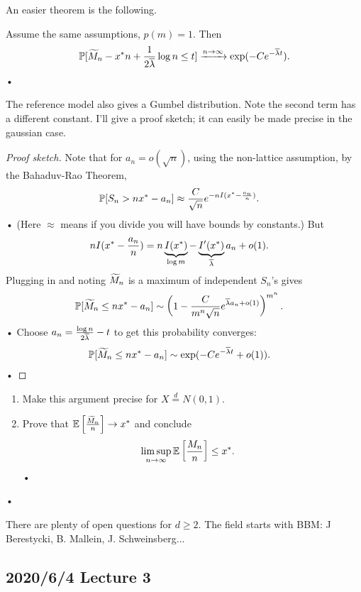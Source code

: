 An easier theorem is the following. %
\begin{thm}
Assume the same assumptions, $p(m)=1$. Then
\begin{align*}
\mathbb{P}[\widetilde{M}_n - x^* n + \frac{1}{2\overline{\lambda} }\log n\le t]
\xrightarrow{n\to \infty} \exp(-Ce^{-\overline{\lambda} t}). 
\end{align*}•
\end{thm}
The reference model also gives a Gumbel distribution. Note the second term has a different constant. I'll give a proof sketch; it can easily be made precise in the gaussian case. 
\begin{proof}[Proof sketch]
Note that for $a_n=o(\sqrt n)$, using the non-lattice assumption, by the Bahaduv-Rao Theorem,
\begin{align*}
\mathbb{P}[S_n > nx^* - a_n] &\approx \frac{C}{\sqrt n} e^{-nI(x^*-\frac{a_n}{n})}.
\end{align*}•
(Here $\approx$ means if you divide you will have bounds by constants.)
But 
\begin{align*}
nI(x^*-\frac{a_n}{n}) &= n\underbrace{I(x^*)}_{\log m} - \underbrace{I'(x^*)}_{\overline{\lambda}}a_n + o(1).
\end{align*}
Plugging in and noting $\widetilde{M}_n$ is a maximum of independent $S_n$'s gives
\begin{align*}
\mathbb{P}[\widetilde{M}_n \le nx^* - a_n]
&\sim \left( {1-\frac{C}{m^n\sqrt n} e^{\overline{\lambda} a_n + o(1)}} \right)^{m^n}.
\end{align*}•
Choose $a_n = \frac{\log n}{2\overline{\lambda}} - t$ to get this probability converges:
\begin{align*}
\mathbb{P}[\widetilde{M}_n \le nx^* - a_n]
&\sim \exp(-Ce^{-\overline{\lambda} t}+o(1)).
\end{align*}•
\end{proof}
\begin{exr}
\begin{enumerate}
\item
Make this argument precise for $X\stackrel d= N(0,1)$. 
\item
Prove that $\mathbb{E}\left[ {\frac{\widetilde{M}_n}{n}} \right]\to x^*$ and conclude
\begin{align*}
\limsup_{n\to \infty} \mathbb{E}\left[ {\frac{M_n}{n}} \right] &\le x^*.
\end{align*}•
\end{enumerate}•
\end{exr}
There are plenty of open questions for $d\ge 2$. The field starts with BBM: J Berestycki, B. Mallein, J. Schweinsberg...

\subsection*{2020/6/4 Lecture 3}

